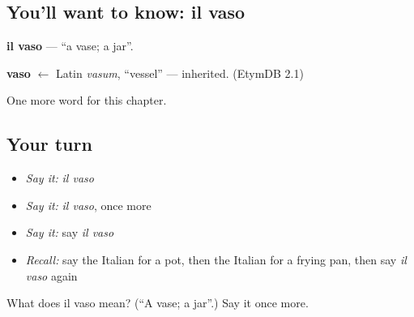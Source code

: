 \subsection*{You'll want to know: il vaso}
\textbf{il vaso} — \textquotedblleft{}a vase; a jar\textquotedblright{}.

\begin{cousinweb}
\textbf{vaso} $\leftarrow$ Latin \emph{vasum}, \textquotedblleft{}vessel\textquotedblright{} — inherited. (EtymDB 2.1)
\end{cousinweb}

\begin{grammarlens}[title={What you've built}]
One more word for this chapter.
\end{grammarlens}

\subsection*{Your turn}
\begin{itemize}
\raggedright
  \item \emph{Say it:} \emph{il vaso}
  \item \emph{Say it:} \emph{il vaso}, once more
  \item \emph{Say it:} say \emph{il vaso}
  \item \emph{Recall:} say the Italian for a pot, then the Italian for a frying pan, then say \emph{il vaso} again
\end{itemize}

\begin{tcolorbox}[breakable,colback=teal!4,colframe=teal!35!black,title={Before you move on}]
What does il vaso mean? (\textquotedblleft{}A vase; a jar\textquotedblright{}.) Say it once more.
\end{tcolorbox}
